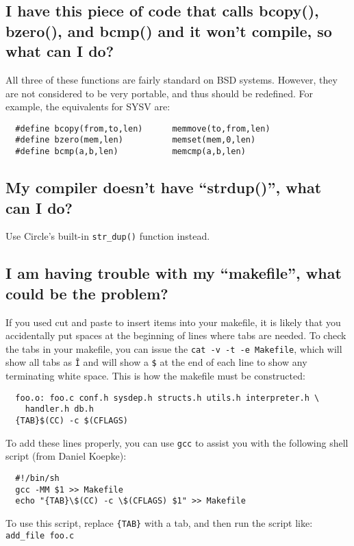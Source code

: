 \documentclass[11pt]{article}
\begin{document}
\subsection{I have this piece of code that calls bcopy(), bzero(), and bcmp() and it won't compile, so what can I do?}
All three of these functions are fairly standard on BSD systems.  However, they are not considered to be very portable, and thus should be redefined. For example, the equivalents for SYSV are: 
\begin{verbatim}
  #define bcopy(from,to,len)      memmove(to,from,len)
  #define bzero(mem,len)          memset(mem,0,len)
  #define bcmp(a,b,len)           memcmp(a,b,len)
\end{verbatim}

\subsection{My compiler doesn't have ``strdup()'', what can I do?}
Use Circle's built-in \texttt{str\_dup()} function instead.

\subsection{I am having trouble with my ``makefile'', what could be the problem?}
If you used cut and paste to insert items into your makefile, it is likely that you accidentally put spaces at the beginning of lines where tabs are needed.  To check the tabs in your makefile, you can issue the \texttt{cat -v -t -e Makefile}, which will show all tabs as \texttt{\^I} and will show a \texttt{\$} at the end of each line to show any terminating white space. This is how the makefile must be constructed:
\begin{verbatim}
  foo.o: foo.c conf.h sysdep.h structs.h utils.h interpreter.h \
    handler.h db.h
  {TAB}$(CC) -c $(CFLAGS)
\end{verbatim}
To add these lines properly, you can use \texttt{gcc} to assist you with the following shell script (from Daniel Koepke):
\begin{verbatim}
  #!/bin/sh
  gcc -MM $1 >> Makefile
  echo "{TAB}\$(CC) -c \$(CFLAGS) $1" >> Makefile
\end{verbatim}
To use this script, replace \texttt{\{TAB\}} with a tab, and then run the script like: \texttt{add\_file foo.c}
\end{document}
